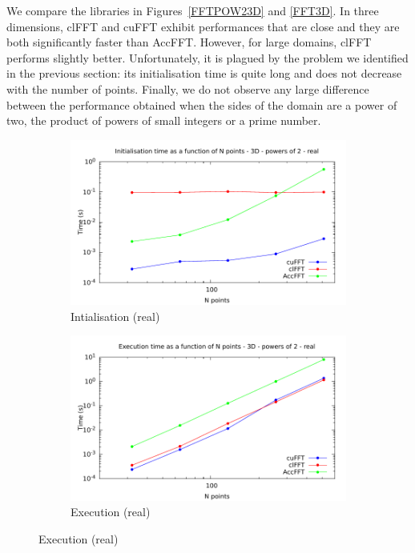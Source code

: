 \documentclass[12pt, a4paper]{article}
\begin{document}
We compare the libraries in Figures~\ref{FFTPOW23D} and \ref{FFT3D}.
In three dimensions, clFFT and cuFFT exhibit performances that are
close and they are both significantly faster than AccFFT. However,
for large domains, clFFT performs slightly better. Unfortunately, it
is plagued by the problem we identified in the previous section: its
initialisation time is quite long and does not decrease with the
number of points. Finally, we do not observe any large difference
between the performance obtained when the sides of the domain are a
power of two, the product of powers of small integers or a prime
number.



\begin{figure}[H]
\captionsetup{width=0.8\linewidth}
\centering
\begin{subfigure}{.5\textwidth}
\centering
\includegraphics[width=.9\linewidth]{graphs/fft-3d-pow2-r-init.pdf}
\caption{Intialisation (real)}
\label{FFTPOW23DRI}
\end{subfigure}%
\begin{subfigure}{.5\textwidth}
\centering
\includegraphics[width=.9\linewidth]{graphs/fft-3d-pow2-r-exec.pdf}
\caption{Execution (real)}

\end{subfigure}
\end{figure}
\end{document}
